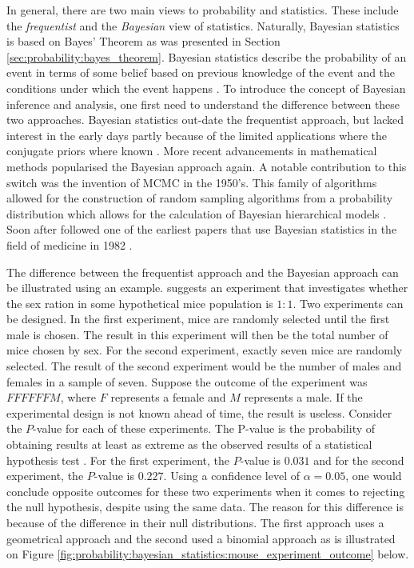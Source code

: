 In general, there are two main views to probability and statistics. These include the \textit{frequentist} and the \textit{Bayesian} view of statistics. Naturally, Bayesian statistics is based on Bayes' Theorem as was presented in Section \ref{sec:probability:bayes_theorem}. Bayesian statistics describe the probability of an event in terms of some belief based on previous knowledge of the event and the conditions under which the event happens \cite{ref:hackenberger:2019}. To introduce the concept of Bayesian inference and analysis, one first need to understand the difference between these two approaches. Bayesian statistics out-date the frequentist approach, but lacked interest in the early days partly because of the limited applications where the conjugate priors where known \cite{ref:hackenberger:2019}. More recent advancements in mathematical methods popularised the Bayesian approach again. A notable contribution to this switch was the invention of \ac{MCMC} in the 1950's. This family of algorithms allowed for the construction of random sampling algorithms from a probability distribution which allows for the calculation of Bayesian hierarchical models \cite{ref:hackenberger:2019}. Soon after followed one of the earliest papers that use Bayesian statistics in the field of medicine in 1982 \cite{ref:ashby:2006}. 

The difference between the frequentist approach and the Bayesian approach can be illustrated using an example. \citeauthor{ref:hackenberger:2019} \cite{ref:hackenberger:2019} suggests an experiment that investigates whether the sex ration in some hypothetical mice population is $1:1$. Two experiments can be designed. In the first experiment, mice are randomly selected until the first male is chosen. The result in this experiment will then be the total number of mice chosen by sex. For the second experiment, exactly seven mice are randomly selected. The result of the second experiment would be the number of males and females in a sample of seven. Suppose the outcome of the experiment was $FFFFFFM$, where $F$ represents a female and $M$ represents a male. If the experimental design is not known ahead of time, the result is useless. Consider the $P$-value for each of these experiments. The P-value is the probability of obtaining results at least as extreme as the observed results of a statistical hypothesis test \cite{ref:beers:2022}. For the first experiment, the $P$-value is $0.031$ and for the second experiment, the $P$-value is $0.227$. Using a confidence level of $\alpha = 0.05$, one would conclude opposite outcomes for these two experiments when it comes to rejecting the null hypothesis, despite using the same data. The reason for this difference is because of the difference in their null distributions. The first approach uses a geometrical approach and the second used a binomial approach as is illustrated on Figure \ref{fig:probability:bayesian_statistics:mouse_experiment_outcome} below.


